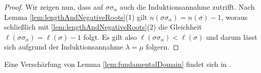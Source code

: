 \begin{proof}
  Wir zeigen nun, dass auf $\sigma \sigma_\alpha$ auch die Induktionsannahme zutrifft.
  Nach Lemma \ref{lem:lengthAndNegativeRoots}(1) gilt $n(\sigma\sigma_\alpha) = n(\sigma) - 1$, woraus schließlich mit \ref{lem:lengthAndNegativeRoots}(2) die Gleichheit $\ell(\sigma\sigma_\alpha) = \ell(\sigma) - 1$ folgt.
  Es gilt also $\ell(\sigma\sigma_\alpha) < \ell(\sigma)$ und darum lässt sich aufgrund der Induktionsannahme $\lambda = \mu$ folgern.
\end{proof}
 
Eine Verschärfung von Lemma \ref{lem:fundamentalDomain} findet sich in \cite[S.22]{humphreys1992reflection}.
